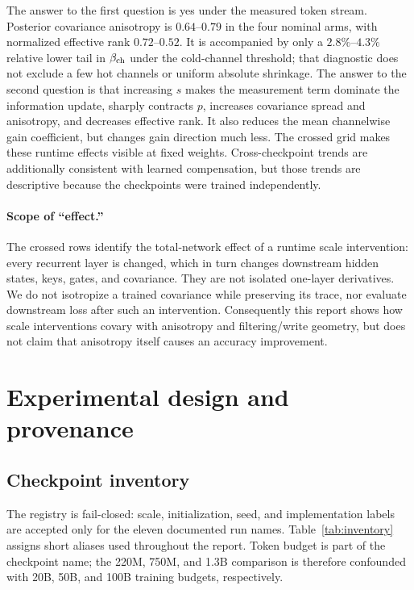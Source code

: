 \documentclass[11pt]{article}
\begin{document}
The answer to the first question is yes under the measured token stream.  Posterior
covariance anisotropy is $0.64$--$0.79$ in the four nominal arms, with normalized
effective rank $0.72$--$0.52$.  It is accompanied by only a $2.8\%$--$4.3\%$ relative
lower tail in $\beta_{\rm ch}$ under the cold-channel threshold; that diagnostic does not
exclude a few hot channels or uniform absolute shrinkage.
The answer to the second question is that increasing $s$ makes the measurement term
dominate the information update, sharply contracts $p$, increases covariance spread and
anisotropy, and decreases effective rank.  It also reduces the mean channelwise gain
coefficient, but changes gain direction much less.  The crossed grid makes these runtime
effects visible at fixed weights.  Cross-checkpoint trends are additionally consistent with
learned compensation, but those
trends are descriptive because the checkpoints were trained independently.

\paragraph{Scope of ``effect.''}
The crossed rows identify the total-network effect of a runtime scale intervention: every
recurrent layer is changed, which in turn changes downstream hidden states, keys, gates,
and covariance.  They are not isolated one-layer derivatives.  We do not isotropize a
trained covariance while preserving its trace, nor evaluate downstream loss after such an
intervention.  Consequently this report shows how scale interventions covary with anisotropy
and filtering/write geometry, but does not claim that anisotropy itself causes an accuracy
improvement.

\section{Experimental design and provenance}

\subsection{Checkpoint inventory}

The registry is fail-closed: scale, initialization, seed, and implementation labels are
accepted only for the eleven documented run names.  Table~\ref{tab:inventory} assigns
short aliases used throughout the report.  Token budget is part of the checkpoint name;
the 220M, 750M, and 1.3B comparison is therefore confounded with 20B, 50B, and 100B
training budgets, respectively.
\end{document}
